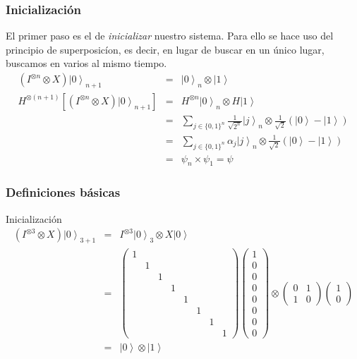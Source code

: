 \begin{frame}
\frametitle{Inicialización}
El primer paso es el de \textit{inicializar} nuestro sistema. Para ello se hace uso del principio de superposicíon, es decir, en lugar de buscar en un único lugar, buscamos en varios al mismo tiempo.
\pause
\begin{eqnarray}
(I^{\otimes n}\otimes X)\left.|0\right\rangle _{n+1}&=&\left.|0\right\rangle _{n}\otimes\left.|1\right\rangle \nonumber\\
H^{\otimes\left(n+1\right)}\left[(I^{\otimes n}\otimes X)\left.|0\right\rangle _{n+1}\right]&=&H^{\otimes n}\left.|0\right\rangle _{n}\otimes H\left.|1\right\rangle \nonumber\\
&=&\sum_{j\in\{0,1\}^{n}}\frac{1}{\sqrt{2^{n}}}\left.|j\right\rangle _{n}\otimes\frac{1}{\sqrt{2}}\left(\left.|0\right\rangle -\left.|1\right\rangle \right)\nonumber\\
&=&\sum_{j\in\{0,1\}^{n}}\alpha_{j}\left.|j\right\rangle _{n}\otimes\frac{1}{\sqrt{2}}\left(\left.|0\right\rangle -\left.|1\right\rangle \right)\nonumber\\
&=&\psi_{n}\times\psi_{1}=\psi\nonumber
\end{eqnarray}
\end{frame}

\begin{frame}
\frametitle{Definiciones básicas}

\begin{exampleblock}{Inicialización}
\begin{eqnarray}
(I^{\otimes3}\otimes X)\left.|0\right\rangle _{3+1}&=&I^{\otimes3}\left.|0\right\rangle _{3}\otimes X\left.|0\right\rangle \\&=&\left(\begin{array}{cccccccc}
1\\
 & 1\\
 &  & 1\\
 &  &  & 1\\
 &  &  &  & 1\\
 &  &  &  &  & 1\\
 &  &  &  &  &  & 1\\
 &  &  &  &  &  &  & 1
\end{array}\right)\left(\begin{array}{c}
1\\
0\\
0\\
0\\
0\\
0\\
0\\
0
\end{array}\right)\otimes\left(\begin{array}{cc}
0 & 1\\
1 & 0
\end{array}\right)\left(\begin{array}{c}
1\\
0
\end{array}\right)\\&=&\left.|0\right\rangle \otimes\left.|1\right\rangle 
\end{eqnarray}
\end{exampleblock}


\end{frame}

